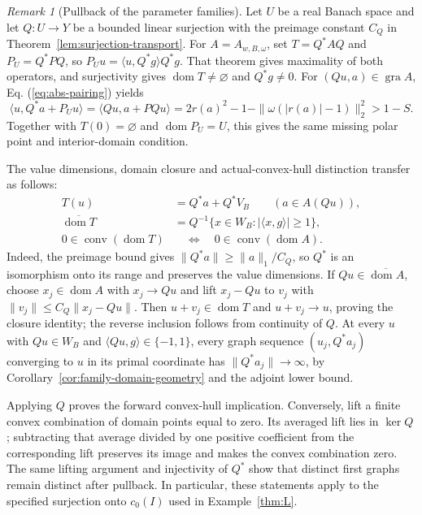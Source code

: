\documentclass[11pt]{article}
\newcommand{\gra}{\operatorname{gra}}
\newcommand{\dom}{\operatorname{dom}}
\newcommand{\pair}[2]{\langle #1,#2\rangle}
\theoremstyle{definition}
\theoremstyle{remark}
\newtheorem{remark}{Remark}
\begin{document}
\begin{remark}[Pullback of the parameter families]
Let $U$ be a real Banach space and let $Q:U\to Y$ be a bounded linear surjection with the preimage constant $C_Q$ in Theorem~\ref{lem:surjection-transport}. For $A=A_{w,B,\omega}$, set $T=Q^*AQ$ and $P_U=Q^*PQ$, so $P_Uu=\pair{u}{Q^*g}Q^*g$. That theorem gives maximality of both operators, and surjectivity gives $\dom T\ne\varnothing$ and $Q^*g\ne0$. For $(Qu,a)\in\gra A$, Eq. (\ref{eq:abs-pairing}) yields
\[
\pair{u}{Q^*a+P_Uu}
=\pair{Qu}{a+PQu}
=2r(a)^2-1-\|\omega(|r(a)|-1)\|_2^2>1-S.
\]
Together with $T(0)=\varnothing$ and $\dom P_U=U$, this gives the same missing polar point and interior-domain condition.

The value dimensions, domain closure and actual-convex-hull distinction transfer as follows:
\begin{equation}
\begin{aligned}
T(u)&=Q^*a+Q^*V_B\qquad(a\in A(Qu)),\\
\overline{\dom T}&=Q^{-1}\{x\in W_B:|\pair{x}{g}|\ge1\},\\
0\in\operatorname{conv}(\dom T)
&\quad\Longleftrightarrow\quad0\in\operatorname{conv}(\dom A).
\end{aligned}
\label{eq:family-pullback-properties}
\end{equation}
Indeed, the preimage bound gives $\|Q^*a\|\ge\|a\|_1/C_Q$, so $Q^*$ is an isomorphism onto its range and preserves the value dimensions. If $Qu\in\overline{\dom A}$, choose $x_j\in\dom A$ with $x_j\to Qu$ and lift $x_j-Qu$ to $v_j$ with $\|v_j\|\le C_Q\|x_j-Qu\|$. Then $u+v_j\in\dom T$ and $u+v_j\to u$, proving the closure identity; the reverse inclusion follows from continuity of $Q$. At every $u$ with $Qu\in W_B$ and $\pair{Qu}{g}\in\{-1,1\}$, every graph sequence $(u_j,Q^*a_j)$ converging to $u$ in its primal coordinate has $\|Q^*a_j\|\to\infty$, by Corollary~\ref{cor:family-domain-geometry} and the adjoint lower bound.

Applying $Q$ proves the forward convex-hull implication. Conversely, lift a finite convex combination of domain points equal to zero. Its averaged lift lies in $\ker Q$; subtracting that average divided by one positive coefficient from the corresponding lift preserves its image and makes the convex combination zero. The same lifting argument and injectivity of $Q^*$ show that distinct first graphs remain distinct after pullback. In particular, these statements apply to the specified surjection onto $c_0(I)$ used in Example~\ref{thm:L}.
\end{remark}
\end{document}
